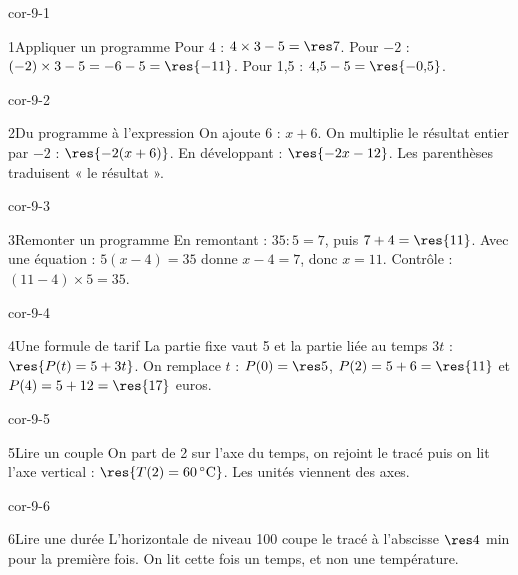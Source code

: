 \clearpage\pagestyle{otMain}\setlength{\otBlocEspacement}{2.5mm}\fontsize{11}{15}\selectfont{}
\begin{blocLivre}{cor-9-1}\begin{corrige}{1}{Appliquer un programme}
Pour 4 : $4\times3-5=\res7$. Pour $-2$ : $(-2)\times3-5=-6-5=\res{-11}$. Pour 1,5 : $4{,}5-5=\res{-0{,}5}$.
\end{corrige}\end{blocLivre}
\begin{blocLivre}{cor-9-2}\begin{corrige}{2}{Du programme à l’expression}
On ajoute 6 : $x+6$. On multiplie le résultat entier par $-2$ : $\res{-2(x+6)}$. En développant : $\res{-2x-12}$. Les parenthèses traduisent « le résultat ».
\end{corrige}\end{blocLivre}
\begin{blocLivre}{cor-9-3}\begin{corrige}{3}{Remonter un programme}
En remontant : $35:5=7$, puis $7+4=\res{11}$. Avec une équation : $5(x-4)=35$ donne $x-4=7$, donc $x=11$. Contrôle : $(11-4)\times5=35$.
\end{corrige}\end{blocLivre}
\begin{blocLivre}{cor-9-4}\begin{corrige}{4}{Une formule de tarif}
La partie fixe vaut 5 et la partie liée au temps $3t$ : $\res{P(t)=5+3t}$. On remplace $t$ : $P(0)=\res5$, $P(2)=5+6=\res{11}$ et $P(4)=5+12=\res{17}$ euros.
\end{corrige}\end{blocLivre}
\begin{blocLivre}{cor-9-5}\begin{corrige}{5}{Lire un couple}
On part de 2 sur l’axe du temps, on rejoint le tracé puis on lit l’axe vertical : $\res{T(2)=60\,^\circ\mathrm C}$. Les unités viennent des axes.
\label{fig-cor-9-5}
\end{corrige}\end{blocLivre}
\begin{blocLivre}{cor-9-6}\begin{corrige}{6}{Lire une durée}
L’horizontale de niveau 100 coupe le tracé à l’abscisse $\res4$ min pour la première fois. On lit cette fois un temps, et non une température.
\label{fig-cor-9-6}
\end{corrige}\end{blocLivre}
